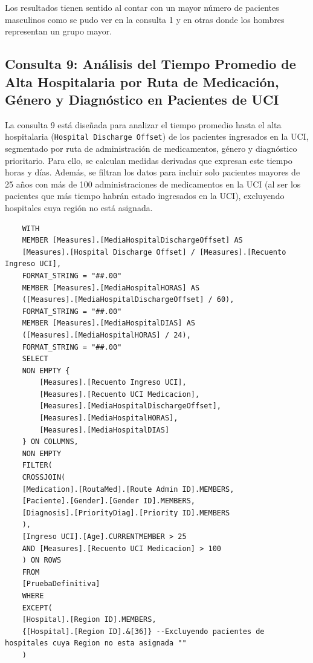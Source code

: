 \documentclass[12pt, a4paper, twoside]{article}
\begin{document}
Los resultados tienen sentido al contar con un mayor número de pacientes masculinos como se pudo ver en la consulta 1 y en otras donde los hombres representan un grupo mayor.

\subsection{Consulta 9: Análisis del Tiempo Promedio de Alta Hospitalaria por Ruta de Medicación, Género y Diagnóstico en Pacientes de UCI}
La consulta 9 está diseñada para analizar el tiempo promedio hasta el alta hospitalaria (\texttt{Hospital Discharge Offset}) de los pacientes ingresados en la UCI, segmentado por ruta de administración de medicamentos, género y diagnóstico prioritario. Para ello, se calculan medidas derivadas que expresan este tiempo horas y días. Además, se filtran los datos para incluir solo pacientes mayores de 25 años con más de 100 administraciones de medicamentos en la UCI (al ser los pacientes que más tiempo habrán estado ingresados en la UCI), excluyendo hospitales cuya región no está asignada.

\begin{verbatim}
	WITH 
	MEMBER [Measures].[MediaHospitalDischargeOffset] AS
	[Measures].[Hospital Discharge Offset] / [Measures].[Recuento Ingreso UCI],
	FORMAT_STRING = "##.00"
	MEMBER [Measures].[MediaHospitalHORAS] AS
	([Measures].[MediaHospitalDischargeOffset] / 60),
	FORMAT_STRING = "##.00"
	MEMBER [Measures].[MediaHospitalDIAS] AS
	([Measures].[MediaHospitalHORAS] / 24),
	FORMAT_STRING = "##.00"
	SELECT 
	NON EMPTY { 
		[Measures].[Recuento Ingreso UCI],
		[Measures].[Recuento UCI Medicacion],
		[Measures].[MediaHospitalDischargeOffset],
		[Measures].[MediaHospitalHORAS], 
		[Measures].[MediaHospitalDIAS]
	} ON COLUMNS,
	NON EMPTY 
	FILTER(
	CROSSJOIN(
	[Medication].[RoutaMed].[Route Admin ID].MEMBERS,
	[Paciente].[Gender].[Gender ID].MEMBERS,
	[Diagnosis].[PriorityDiag].[Priority ID].MEMBERS
	),
	[Ingreso UCI].[Age].CURRENTMEMBER > 25
	AND [Measures].[Recuento UCI Medicacion] > 100
	) ON ROWS
	FROM 
	[PruebaDefinitiva]
	WHERE 
	EXCEPT(
	[Hospital].[Region ID].MEMBERS,
	{[Hospital].[Region ID].&[36]} --Excluyendo pacientes de hospitales cuya Region no esta asignada ""
	)
\end{verbatim}
\end{document}
